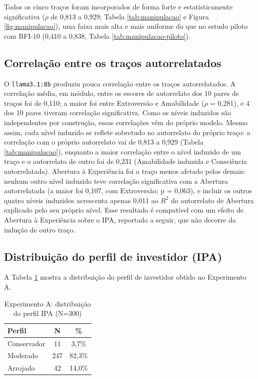 Todos os cinco traços foram incorporados de forma forte e
estatisticamente significativa ($\rho$ de 0,813 a 0,929; Tabela
\ref{tab:manipulacao} e Figura \ref{fig:manipulacao}), uma faixa mais
alta e mais uniforme do que no estudo piloto com BFI-10 (0,410 a 0,838,
Tabela \ref{tab:manipulacao-piloto}).

\subsection{Correlação entre os traços autorrelatados}
\label{sec:resultados-intercorrelacao}

O \texttt{llama3.1:8b} produziu pouca correlação entre os traços
autorrelatados. A
correlação média, em módulo, entre os escores de autorrelato dos 10 pares
de traços foi de 0,110; a maior foi entre Extroversão e Amabilidade
($\rho$ = 0,281), e 4 dos 10 pares tiveram correlação significativa. Como
os níveis induzidos são independentes por construção, essas correlações
vêm do próprio modelo. Mesmo assim, cada nível induzido se reflete
sobretudo no autorrelato do próprio traço: a correlação com o próprio
autorrelato vai de 0,813 a 0,929 (Tabela \ref{tab:manipulacao}), enquanto
a maior correlação entre o nível induzido de um traço e o autorrelato de
outro foi de 0,231 (Amabilidade induzida e Consciência autorrelatada).
Abertura à Experiência foi o traço menos afetado pelos demais: nenhum
outro nível induzido teve correlação significativa com a Abertura
autorrelatada (a maior foi 0,107, com Extroversão; p = 0,063), e incluir
os outros quatro níveis induzidos acrescenta apenas 0,011 ao $R^2$ do
autorrelato de Abertura explicado pelo seu próprio nível. Esse resultado
é compatível com um efeito de Abertura à Experiência sobre o IPA,
reportado a seguir, que não decorre da indução de outro traço.

\subsection{Distribuição do perfil de investidor (IPA)}

A Tabela \ref{tab:distribuicao-ipa} mostra a distribuição do perfil de
investidor obtido no Experimento A.

\begin{table}[htb]
    \caption{Experimento A: distribuição do perfil IPA (N=300)}
    \label{tab:distribuicao-ipa}
    \centering
    \begin{tabular}{lcc}
        \toprule
        Perfil & N & \% \\
        \midrule
        Conservador & 11  & 3,7\%  \\
        Moderado    & 247 & 82,3\% \\
        Arrojado    & 42  & 14,0\% \\
        \bottomrule
    \end{tabular}
\end{table}

